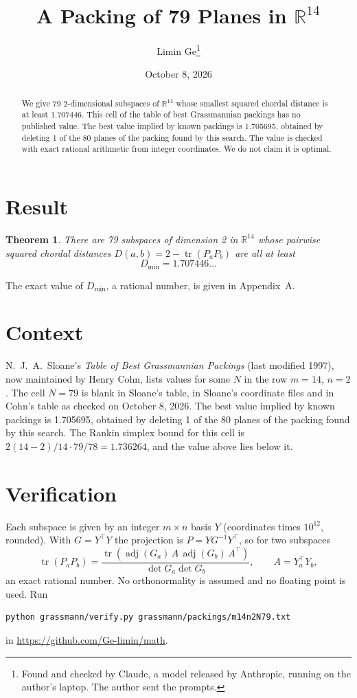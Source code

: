 \documentclass[11pt,a4paper]{article}
\title{A Packing of 79 Planes in $\mathbb{R}^{14}$}
\author{Limin Ge\thanks{Found and checked by Claude, a model released by Anthropic, running on the author's laptop. The author sent the prompts.}}
\date{October 8, 2026}
\newtheorem*{theorem}{Theorem}
\begin{document}
\maketitle
\begin{abstract}
We give 79 2-dimensional subspaces of $\mathbb{R}^{14}$ whose smallest squared chordal distance is at least 1.707446. This cell of the table of best Grassmannian packings has no published value. The best value implied by known packings is 1.705695, obtained by deleting 1 of the 80 planes of the packing found by this search. The value is checked with exact rational arithmetic from integer coordinates. We do not claim it is optimal.
\end{abstract}

\section{Result}
\begin{theorem}
There are 79 subspaces of dimension 2 in $\mathbb{R}^{14}$ whose pairwise squared chordal distances $D(a,b) = 2 - \operatorname{tr}(P_aP_b)$ are all at least
\[ D_{\min} = 1.707446\ldots \]
\end{theorem}
The exact value of $D_{\min}$, a rational number, is given in Appendix~A.


\section{Context}
N.~J.~A.~Sloane's \emph{Table of Best Grassmannian Packings} (last modified 1997), now maintained by Henry Cohn, lists values for some $N$ in the row $m=14$, $n=2$. The cell $N=79$ is blank in Sloane's table, in Sloane's coordinate files and in Cohn's table as checked on October 8, 2026. The best value implied by known packings is 1.705695, obtained by deleting 1 of the 80 planes of the packing found by this search. The Rankin simplex bound for this cell is $2(14-2)/14\cdot 79/78 = 1.736264$, and the value above lies below it.


\section{Verification}
Each subspace is given by an integer $m\times n$ basis $Y$ (coordinates times $10^{12}$, rounded). With $G=Y^\top Y$ the projection is $P=YG^{-1}Y^\top$, so for two subspaces
\[ \operatorname{tr}(P_aP_b)=\frac{\operatorname{tr}(\operatorname{adj}(G_a)\,A\,\operatorname{adj}(G_b)\,A^\top)}{\det G_a\det G_b},\qquad A=Y_a^\top Y_b, \]
an exact rational number. No orthonormality is assumed and no floating point is used. Run
\begin{verbatim}
python grassmann/verify.py grassmann/packings/m14n2N79.txt
\end{verbatim}
in \url{https://github.com/Ge-limin/math}.
\end{document}
